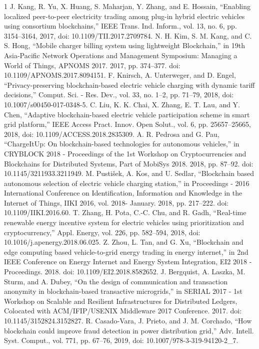 \documentclass[lettersize,journal]{IEEEtran}
\begin{document}
\begin{thebibliography}{1}
\bibitem{}J. Kang, R. Yu, X. Huang, S. Maharjan, Y. Zhang, and E. Hossain, “Enabling localized peer-to-peer electricity trading among plug-in hybrid electric vehicles using consortium blockchains,” IEEE Trans. Ind. Inform., vol. 13, no. 6, pp. 3154–3164, 2017, doi: 10.1109/TII.2017.2709784.
\bibitem{}N. H. Kim, S. M. Kang, and C. S. Hong, “Mobile charger billing system using lightweight Blockchain,” in 19th Asia-Pacific Network Operations and Management Symposium: Managing a World of Things, APNOMS 2017. 2017, pp. 374–377. doi: 10.1109/APNOMS.2017.8094151.
\bibitem{}F. Knirsch, A. Unterweger, and D. Engel, “Privacy-preserving blockchain-based electric vehicle charging with dynamic tariff decisions,” Comput. Sci. - Res. Dev., vol. 33, no. 1–2, pp. 71–79, 2018, doi: 10.1007/s00450-017-0348-5.
\bibitem{}C. Liu, K. K. Chai, X. Zhang, E. T. Lau, and Y. Chen, “Adaptive blockchain-based electric vehicle participation scheme in smart grid platform,” IEEE Access Pract. Innov. Open Solut., vol. 6, pp. 25657–25665, 2018, doi: 10.1109/ACCESS.2018.2835309.
\bibitem{}A. R. Pedrosa and G. Pau, “ChargeItUp: On blockchain-based technologies for autonomous vehicles,” in CRYBLOCK 2018 - Proceedings of the 1st Workshop on Cryptocurrencies and Blockchains for Distributed Systems, Part of MobiSys 2018. 2018, pp. 87–92. doi: 10.1145/3211933.3211949.
\bibitem{}M. Pustišek, A. Kos, and U. Sedlar, “Blockchain based autonomous selection of electric vehicle charging station,” in Proceedings - 2016 International Conference on Identification, Information and Knowledge in the Internet of Things, IIKI 2016, vol. 2018- January. 2018, pp. 217–222. doi: 10.1109/IIKI.2016.60.
\bibitem{}T. Zhang, H. Pota, C.-C. Chu, and R. Gadh, “Real-time renewable energy incentive system for electric vehicles using prioritization and cryptocurrency,” Appl. Energy, vol. 226, pp. 582–594, 2018, doi: 10.1016/j.apenergy.2018.06.025.
\bibitem{}Z. Zhou, L. Tan, and G. Xu, “Blockchain and edge computing based vehicle-to-grid energy trading in energy internet,” in 2nd IEEE Conference on Energy Internet and Energy System Integration, EI2 2018 - Proceedings. 2018. doi: 10.1109/EI2.2018.8582652.
\bibitem{}J. Bergquist, A. Laszka, M. Sturm, and A. Dubey, “On the design of communication and transaction anonymity in blockchain-based transactive microgrids,” in SERIAL 2017 - 1st Workshop on Scalable and Resilient Infrastructures for Distributed Ledgers, Colocated with ACM/IFIP/USENIX Middleware 2017 Conference. 2017. doi: 10.1145/3152824.3152827.
\bibitem{}R. Casado-Vara, J. Prieto, and J. M. Corchado, “How blockchain could improve fraud detection in power distribution grid,” Adv. Intell. Syst. Comput., vol. 771, pp. 67–76, 2019, doi: 10.1007/978-3-319-94120-2\_7.

\end{thebibliography}
\end{document}
